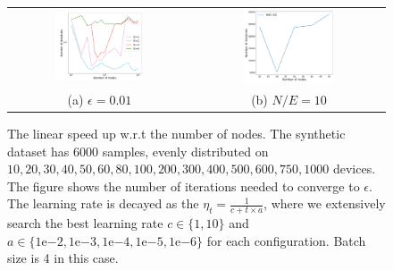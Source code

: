 \begin{figure}
\centering
\begin{tabular}{cc}
\includegraphics[width=0.5\textwidth]{fig/synthetic_linear_regression_1k_6k-epsilon001-logTrue-epoch-1-2-3-4-b4-adapt0.pdf} & 
\includegraphics[width=0.5\textwidth]{fig/iteration_EandN-synthetic_linear_regression_1k_6k-epsilon01.pdf} 
 \\
(a) $\epsilon=0.01$  & (b) $N/E = 10$ 
\end{tabular}
	\caption{The linear speed up w.r.t the number of nodes. The synthetic dataset has $6000$ samples, evenly distributed on $10, 20, 30, 40, 50, 60, 80, 100, 200, 300, 400, 500, 600, 750, 1000$ devices. The figure shows the number of iterations needed to converge to $\epsilon$. The learning rate is decayed as the $\eta_t = \frac{1}{c + t \times a}$, where we extensively search the best learning rate $c \in \{1, 10\}$ and $a \in \{1\mathrm{e}{-2}, 1\mathrm{e}{-3}, 1\mathrm{e}{-4}, 1\mathrm{e}{-5}, 1\mathrm{e}{-6}\}$ for each configuration. Batch size is 4 in this case.}
\end{figure}


